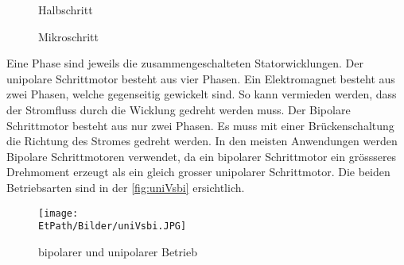      \begin{figure}[H]
     	\centering
     	\caption{Halbschritt}
     	\label{fig:halbschritt}
     \end{figure}
    \begin{figure}[H]
    	\centering
    	\caption{Mikroschritt}
    	\label{fig:mikroschritt}
    \end{figure}
    Eine Phase sind jeweils die zusammengeschalteten Statorwicklungen. Der unipolare Schrittmotor besteht aus vier Phasen. Ein Elektromagnet besteht aus zwei Phasen, welche gegenseitig gewickelt sind. So kann vermieden werden, dass der Stromfluss durch die Wicklung gedreht werden muss. Der Bipolare Schrittmotor besteht aus nur zwei Phasen. Es muss mit einer Brückenschaltung die Richtung des Stromes gedreht werden. In den meisten Anwendungen werden Bipolare Schrittmotoren verwendet, da ein bipolarer Schrittmotor ein grössseres Drehmoment erzeugt als ein gleich grosser unipolarer Schrittmotor. Die beiden Betriebsarten sind in der \autoref{fig:uniVsbi} ersichtlich. 
    \begin{figure}[H]
       	\centering
       	\texttt{[image: \\EtPath/Bilder/uniVsbi.JPG]}
       	\caption{bipolarer und unipolarer Betrieb}
       	\label{fig:uniVsbi}
    \end{figure}
    
       
    
